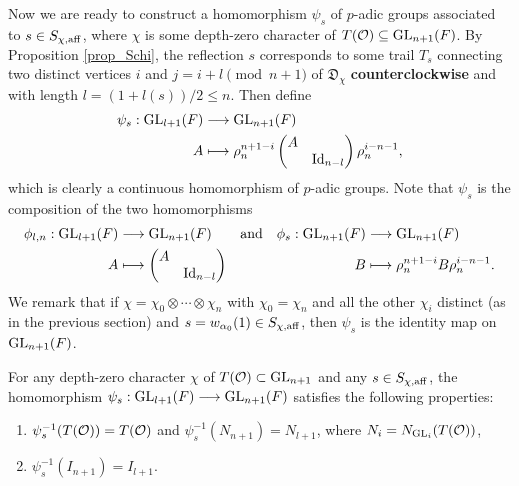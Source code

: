     Now we are ready to construct a homomorphism $\psi_s$ of $p$-adic groups associated to $s\in S_{\chi,\mathrm{aff}}$, where $\chi$ is some depth-zero character of $T(\mathcal{O})\subseteq\mathrm{GL}_{n+1}(F)$. By Proposition \ref{prop_Schi}, the reflection $s$ corresponds to some trail $T_s$ connecting two distinct vertices $i$ and $j=i+l\pmod{n+1}$ of $\mathfrak{D}_\chi$ \textbf{counterclockwise} and with length $l=(1+l(s))/2\leq n$. Then define
    \begin{align}\label{eqn_psis}
        \psi_s:\mathrm{GL}_{l+1}(F)&\longrightarrow\mathrm{GL}_{n+1}(F)\\
        A&\longmapsto\rho_n^{n+1-i}
        \begin{pmatrix}
            A&\\
            & \mathrm{Id}_{n-l}
        \end{pmatrix}\rho_n^{i-n-1},
    \end{align}
    which is clearly a continuous homomorphism of $p$-adic groups. Note that $\psi_s$ is the composition of the two homomorphisms
    \begin{align*}
        \phi_{l,n}:\mathrm{GL}_{l+1}(F)&\longrightarrow\mathrm{GL}_{n+1}(F)&\text{and}\quad\phi_s:\mathrm{GL}_{n+1}(F)&\longrightarrow\mathrm{GL}_{n+1}(F)\\
        A&\longmapsto
        \begin{pmatrix}
            A&\\
            &\mathrm{Id}_{n-l}
        \end{pmatrix}
        &B&\longmapsto\rho_n^{n+1-i}
        B\rho_n^{i-n-1}.
    \end{align*}
    We remark that if $\chi=\chi_0\otimes\cdots\otimes\chi_n$ with $\chi_0=\chi_n$ and all the other $\chi_i$ distinct (as in the previous section) and $s=w_{\alpha_0}(1)\in S_{\chi,\mathrm{aff}}$, then $\psi_s$ is the identity map on $\mathrm{GL}_{n+1}(F)$.

    \begin{lemma}
        For any depth-zero character $\chi$ of $T(\mathcal{O})\subset\mathrm{GL}_{n+1}$ and any $s\in S_{\chi,\mathrm{aff}}$, the homomorphism $\psi_s:\mathrm{GL}_{l+1}(F)\longrightarrow\mathrm{GL}_{n+1}(F)$ satisfies the following properties:
        \begin{enumerate}
            \item $\psi_s^{-1}(T(\mathcal{O}))=T(\mathcal{O})$ and $\psi_s^{-1}(N_{n+1})=N_{l+1}$, where $N_i=N_{\mathrm{GL}_i}(T(\mathcal{O}))$,
            \item $\psi_s^{-1}(I_{n+1})=I_{l+1}$.
        \end{enumerate}
    \end{lemma}

